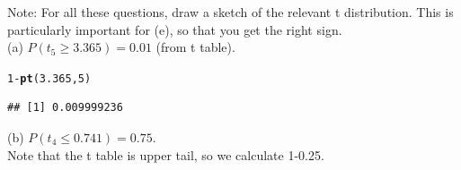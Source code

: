 \documentclass[bigtut]{tutorial}\usepackage[]{graphicx}\usepackage[]{color}
\makeatletter
\newcommand{\hlnum}[1]{\textcolor[rgb]{0.686,0.059,0.569}{#1}}%
\newcommand{\hlopt}[1]{\textcolor[rgb]{0,0,0}{#1}}%
\newcommand{\hlstd}[1]{\textcolor[rgb]{0.345,0.345,0.345}{#1}}%
\newcommand{\hlkwd}[1]{\textcolor[rgb]{0.737,0.353,0.396}{\textbf{#1}}}%
\newenvironment{kframe}{%
 \def\at@end@of@kframe{}%
 \ifinner\ifhmode%
  \def\at@end@of@kframe{\end{minipage}}%
  \begin{minipage}{\columnwidth}%
 \fi\fi%
 \def\FrameCommand##1{\hskip\@totalleftmargin \hskip-\fboxsep
 \colorbox{shadecolor}{##1}\hskip-\fboxsep
     \hskip-\linewidth \hskip-\@totalleftmargin \hskip\columnwidth}%
 \MakeFramed {\advance\hsize-\width
   \@totalleftmargin\z@ \linewidth\hsize
   \@setminipage}}%
 {\par\unskip\endMakeFramed%
 \at@end@of@kframe}
\newenvironment{knitrout}{}{} %
\makeatother
\begin{document}
\begin{tutorial}
\begin{questions}
\question 



\begin{solution}
Note: For all these questions, draw a sketch of the relevant t distribution. This is particularly important for (e), so that you get the right sign. \\


(a) 
$P(t_{5} \geq 3.365) = 0.01$ (from t table). \\

\begin{knitrout}
\color{fgcolor}\begin{kframe}
\begin{alltt}
\hlnum{1}\hlopt{-}\hlkwd{pt}\hlstd{(}\hlnum{3.365}\hlstd{,}\hlnum{5}\hlstd{)}
\end{alltt}
\begin{verbatim}
## [1] 0.009999236
\end{verbatim}
\end{kframe}
\end{knitrout}

\vspace{.5cm}
(b)
$P(t_{4} \leq 0.741) = 0.75$.  \\
Note that the t table is upper tail, so we calculate 1-0.25. \\


\end{solution}
\end{questions}
\end{tutorial}
\end{document}
